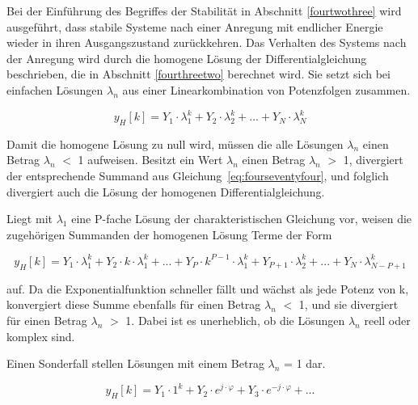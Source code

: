 \noindent Bei der Einf\"{u}hrung des Begriffes der Stabilit\"{a}t in Abschnitt \ref{fourtwothree} wird ausgef\"{u}hrt, dass stabile Systeme nach einer Anregung mit endlicher Energie wieder in ihren Ausgangszustand zur\"{u}ckkehren. Das Verhalten des Systems nach der Anregung wird durch die homogene L\"{o}sung der Differentialgleichung beschrieben, die in Abschnitt \ref{fourthreetwo} berechnet wird. Sie setzt sich bei einfachen L\"{o}sungen $\lambda_{n}$ aus einer Linearkombination von Potenzfolgen zusammen. 

\begin{equation}\label{eq:fourseventyfour}
y_{H} \left[k\right]=Y_{1} \cdot \lambda _{1}^{k} +Y_{2} \cdot \lambda _{2}^{k} +...+Y_{N} \cdot \lambda _{N}^{k} 
\end{equation}

\noindent Damit die homogene L\"{o}sung zu null wird, m\"{u}ssen die alle L\"{o}sungen $\lambda$${}_{n}$ einen Betrag {\textbar}$\lambda$${}_{n}${\textbar} $\mathrm{<}$ 1 aufweisen. Besitzt ein Wert $\lambda_{n}$ einen Betrag {\textbar}$\lambda_{n}${\textbar} $\mathrm{>}$ 1, divergiert der entsprechende Summand aus Gleichung~\eqref{eq:fourseventyfour}, und folglich divergiert auch die L\"{o}sung der homogenen Differentialgleichung.\medskip

\noindent Liegt mit $\lambda_{1}$ eine P-fache L\"{o}sung der charakteristischen Gleichung vor, weisen die zugeh\"{o}rigen Summanden der homogenen L\"{o}sung Terme der Form 

\begin{equation}\label{eq:fourseventyfive}
y_{H} \left[k\right]=Y_{1} \cdot \lambda _{1}^{k} +Y_{2} \cdot k\cdot \lambda _{1}^{k} +...+Y_{P} \cdot k^{P-1} \cdot \lambda _{1}^{k} +Y_{P+1} \cdot \lambda _{2}^{k} +...+Y_{N} \cdot \lambda _{N-P+1}^{k}
\end{equation}

\noindent auf. Da die Exponentialfunktion schneller f\"{a}llt und w\"{a}chst als jede Potenz von k, konvergiert diese Summe ebenfalls f\"{u}r einen Betrag {\textbar}$\lambda_{n}${\textbar} $\mathrm{<}$ 1, und sie divergiert f\"{u}r einen Betrag {\textbar}$\lambda_{n}${\textbar} $\mathrm{>}$ 1. Dabei ist es unerheblich, ob die L\"{o}sungen $\lambda_{n}$ reell oder komplex sind.\medskip

\noindent Einen Sonderfall stellen L\"{o}sungen mit einem Betrag {\textbar}$\lambda_{n}${\textbar} = 1 dar. 

\begin{equation}\label{eq:fourseventysix}
y_{H} \left[k\right]=Y_{1} \cdot 1^{k} +Y_{2} \cdot e^{j\cdot \varphi } +Y_{3} \cdot e^{-j\cdot \varphi } +...
\end{equation}

